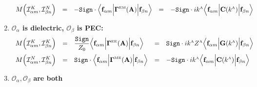 \documentclass[letterpaper]{article}
\begin{document}
\begin{enumerate}
$$\begin{array}{lclcl}
 M\Big( \mathcal{I}^K_{\alpha m}, \mathcal{I}^N_{\beta n} \Big) 
  &=&
  \displaystyle{ -\texttt{Sign}\cdot
                 \Big\langle 
                 \mathbf{f}_{\alpha m} 
                 \Big| \boldsymbol{\Gamma}^{\hbox{\tiny{EM}}}(\mathbf{A}) \Big|
                 \mathbf{f}_{\beta n} 
                 \Big\rangle
               }
  &=&
  \displaystyle{ -\texttt{Sign}\cdot ik^{\hbox{\tiny{A}}}
                  \Big\langle 
                  \mathbf{f}_{\alpha m} 
                  \Big| \mathbf{C}(k^{\hbox{\tiny{A}}})\Big|
                  \mathbf{f}_{\beta n} 
                  \Big\rangle
               }
\end{array}$$
\item \textbf{ $\mathcal{O}_\alpha$ is dielectric, 
               $\mathcal{O}_\beta$ is PEC:}
$$\begin{array}{lclcl}
 M\Big( \mathcal{I}^K_{\alpha m}, \mathcal{I}^K_{\beta n} \Big) 
  &=& 
  \displaystyle{ \frac{\texttt{Sign}}{Z_0} 
                 \Big\langle \mathbf{f}_{\alpha m} 
                 \Big| \boldsymbol{\Gamma}^{\hbox{\tiny{EE}}}(\mathbf{A}) \Big|
                 \mathbf{f}_{\beta n} 
                 \Big\rangle
               }
  &=&
  \displaystyle{ \texttt{Sign}\cdot ik^{\hbox{\tiny{A}}} Z^{\hbox{\tiny{A}}}
                 \Big\langle \mathbf{f}_{\alpha m} 
                 \Big| \mathbf{G}(k^{\hbox{\tiny{A}}}) \Big|
                 \mathbf{f}_{\beta n} 
                 \Big\rangle
               }
\\[10pt]
 M\Big( \mathcal{I}^N_{\alpha m}, \mathcal{I}^K_{\beta n} \Big) 
  &=&
  \displaystyle{ \texttt{Sign}\cdot
                 \Big\langle 
                 \mathbf{f}_{\alpha m} 
                 \Big| \boldsymbol{\Gamma}^{\hbox{\tiny{ME}}}(\mathbf{A}) \Big|
                 \mathbf{f}_{\beta n} 
                 \Big\rangle
               }
  &=&
  \displaystyle{ -\texttt{Sign}\cdot ik^{\hbox{\tiny{A}}}
                  \Big\langle 
                  \mathbf{f}_{\alpha m} 
                  \Big| \mathbf{C}(k^{\hbox{\tiny{A}}})\Big|
                  \mathbf{f}_{\beta n} 
                  \Big\rangle
               }
\end{array}$$
\item \textbf{ $\mathcal{O}_\alpha, \mathcal{O}_\beta$ are both
}
\end{enumerate}
\end{document}
